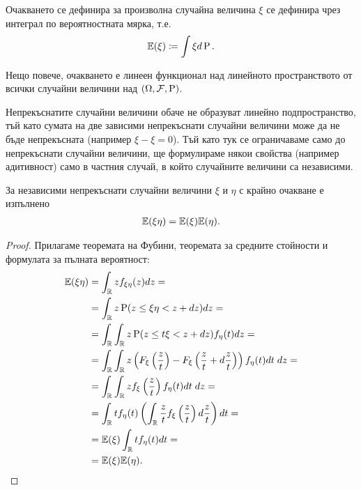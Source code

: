 \documentclass[numbers=endperiod, bibliography=totocnumbered]{scrartcl}
\begin{document}
\begin{note}
  Очакването се дефинира за произволна случайна величина \( \xi \) се дефинира чрез интеграл по вероятностната мярка, т.е.
  \begin{align*}
    \mathbb{E}(\xi) \coloneqq \int \xi d\operatorname{P}.
  \end{align*}

  Нещо повече, очакването е линеен функционал над линейното пространството от всички случайни величини над \( (\Omega, \mathcal{F}, \operatorname{P}) \).

  Непрекъснатите случайни величини обаче не образуват линейно подпространство, тъй като сумата на две зависими непрекъснати случайни величини може да не бъде непрекъсната (например \( \xi - \xi = 0 \)). Тъй като тук се ограничаваме само до непрекъснати случайни величини, ще формулираме някои свойства (например адитивност) само в частния случай, в който случайните величини са независими.
\end{note}

\begin{proposition}\label{thm:expect-product}
  За независими непрекъснати случайни величини \( \xi \) и \( \eta \) с крайно очакване е изпълнено
  \begin{align*}
    \mathbb{E}(\xi \eta) = \mathbb{E}(\xi) \mathbb{E}(\eta).
  \end{align*}
\end{proposition}
\begin{proof}
  Прилагаме теоремата на Фубини, теоремата за средните стойности и формулата за пълната вероятност:
  \begin{align*}
    \mathbb{E}(\xi \eta)
    &=
    \int_{\mathbb{R}} z f_{\xi \eta}(z) dz
    = \\ &=
    \int_{\mathbb{R}} z \operatorname{P}(z \leq \xi \eta < z + dz) dz
    = \\ &=
    \int_{\mathbb{R}} \int_{\mathbb{R}} z \operatorname{P}(z \leq t \xi < z + dz) f_\eta(t) dz
    = \\ &=
    \int_{\mathbb{R}} \int_{\mathbb{R}} z \left( F_\xi\left(\frac z t \right) - F_\xi\left(\frac z t + d\frac z t \right) \right) f_\eta(t) dt \; dz
    = \\ &=
    \int_{\mathbb{R}} \int_{\mathbb{R}} z f_\xi \left(\frac z t \right) f_\eta(t) dt \; dz
    = \\ &=
    \int_{\mathbb{R}} t f_\eta(t) \left(\int_{\mathbb{R}} \frac z t f_\xi \left(\frac z t \right) d\frac z t \right) dt
    = \\ &=
    \mathbb{E}(\xi) \int_{\mathbb{R}} t f_\eta(t) dt
    = \\ &=
    \mathbb{E}(\xi) \mathbb{E}(\eta).
  \end{align*}
\end{proof}
\end{document}
